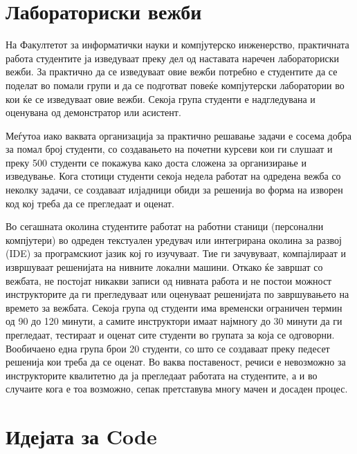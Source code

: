 \documentclass[a4paper,twocolumn]{article}
\begin{document}
\section{Лабораториски вежби}

На Факултетот за информатички науки и компјутерско инженерство, практичната
работа студентите ја изведуваат преку дел од наставата наречен лабораториски
вежби. За практично да се изведуваат овие вежби потребно е студентите да се
поделат во помали групи и да се подготват повеќе компјутерски лаборатории во кои
ќе се изведуваат овие вежби. Секоја група студенти е надгледувана и оценувана од
демонстратор или асистент.

Меѓутоа иако ваквата организација за практично решавање задачи е сосема добра за
помал број студенти, со создавањето на почетни курсеви кои ги слушаат и преку
500 студенти се покажува како доста сложена за организирање и изведување. Кога
стотици студенти секоја недела работат на одредена вежба со неколку задачи, се
создаваат илјадници обиди за решенија во форма на изворен код кој треба да се
прегледаат и оценат.

Во сегашната околина студентите работат на работни станици (персонални
компјутери) во одреден текстуален уредувач или интегрирана околина за развој
(IDE) за програмскиот јазик кој го изучуваат. Тие ги зачувуваат, компајлираат и
извршуваат решенијата на нивните локални машини. Откако ќе завршат со вежбата,
не постојат никакви записи од нивната работа и не постои можност инструкторите
да ги прегледуваат или оценуваат решенијата по завршувањето на времето за
вежбата. Секоја група од студенти има временски ограничен термин од 90 до 120
минути, а самите инструктори имаат најмногу до 30 минути да ги прегледаат,
тестираат и оценат сите студенти во групата за која се одговорни. Вообичаено
една група брои 20 студенти, со што се создаваат преку педесет решенија кои
треба да се оценат. Во ваква поставеност, речиси е невозможно за инструкторите
квалитетно да ја прегледаат работата на студентите, а и во случаите кога е тоа
возможно, сепак претставува многу мачен и досаден процес.

\section{Идејата за Code}
\end{document}
